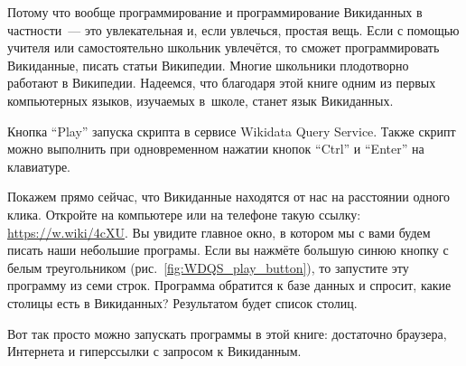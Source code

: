 Потому что вообще программирование и программирование Викиданных в частности~--- это 
увлекательная и, если увлечься, простая вещь. 
Если с помощью учителя или самостоятельно школьник увлечётся, 
то сможет программировать Викиданные, писать статьи Википедии. 
Многие школьники плодотворно работают в Википедии. 
Надеемся, что благодаря этой книге одним из первых компьютерных языков, 
изучаемых в~школе, станет язык Викиданных.

\begin{marginfigure}[0.0cm]
{
\setlength{\fboxsep}{0pt}%
\setlength{\fboxrule}{1pt}%
}
\caption[Выполнение скрипта в сервисе Wikidata Query Service.]{Кнопка ``Play'' запуска скрипта в сервисе Wikidata Query Service. Также скрипт можно выполнить при одновременном нажатии кнопок ``Ctrl'' и ``Enter'' на клавиатуре.}%
\label{fig:WDQS_play_button}%
\end{marginfigure}%
Покажем прямо сейчас, что Викиданные находятся от нас на расстоянии одного клика.
Откройте на компьютере или на телефоне такую ссылку: 
\url{https://w.wiki/4cXU}. 
Вы увидите главное окно, в котором мы с вами будем писать наши небольшие програмы. 
Если вы нажмёте большую синюю кнопку с белым треугольником (рис.~\ref{fig:WDQS_play_button}), 
то запустите эту программу из семи строк. 
Программа обратится к базе данных 
и спросит, какие столицы есть в Викиданных?
Результатом будет список столиц. %

Вот так просто можно запускать программы в этой книге: достаточно браузера, 
Интернета и гиперссылки с запросом к Викиданным.



